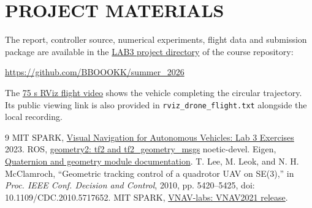 \documentclass[letterpaper,10pt,conference]{ieeeconf}
\begin{document}
\section*{PROJECT MATERIALS}
The report, controller source, numerical experiments, flight data and submission package are available in the \href{https://github.com/BBOOOKK/summer_2026/tree/main/Lab3}{LAB3 project directory} of the course repository:
\begin{center}
\url{https://github.com/BBOOOKK/summer_2026}
\end{center}
The \href{https://drive.google.com/file/d/15DyX_9IlpTixtrpF2S3K7VUW3vkl9Vee/view?usp=sharing}{75 s RViz flight video} shows the vehicle completing the circular trajectory. Its public viewing link is also provided in \texttt{rviz\_drone\_flight.txt} alongside the local recording.

\begin{thebibliography}{9}
 MIT SPARK, \href{https://vnav.mit.edu/labs_2023/lab3/exercises.html}{Visual Navigation for Autonomous Vehicles: Lab 3 Exercises} 2023.
 ROS, \href{https://github.com/ros/geometry2/tree/noetic-devel}{geometry2: tf2 and tf2\_geometry\_msgs} noetic-devel.
 Eigen, \href{https://libeigen.gitlab.io/eigen/docs-nightly/group__Geometry__Module.html}{Quaternion and geometry module documentation}.
 T. Lee, M. Leok, and N. H. McClamroch, ``Geometric tracking control of a quadrotor UAV on SE(3),'' in \emph{Proc. IEEE Conf. Decision and Control}, 2010, pp. 5420--5425, doi: 10.1109/CDC.2010.5717652.
 MIT SPARK, \href{https://github.com/MIT-SPARK/VNAV-labs/releases/tag/VNAV2021}{VNAV-labs: VNAV2021 release}.
\end{thebibliography}
\end{document}
